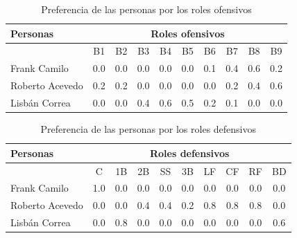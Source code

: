 \begin{table}[H]
		\centering
	\caption{Preferencia de las personas por los roles ofensivos}\label{pref-rol-of-pel}
	\begin{tabular}{l | c c c c c c c c c}
		\toprule[1.7pt]
		\multicolumn{1}{l}{Personas} &         \multicolumn{9}{c}{Roles ofensivos}         \\ \midrule
		                                                           & B1  & B2  & B3  & B4  & B5  & B6  & B7  & B8  & B9  \\ \cline{2-10}
		Frank Camilo                                               & 0.0 & 0.0 & 0.0 & 0.0 & 0.0 & 0.1 & 0.4 & 0.6 & 0.2 \\
		Roberto Acevedo                                            & 0.2 & 0.2 & 0.0 & 0.0 & 0.0 & 0.0 & 0.2 & 0.4 & 0.6 \\
		Lisbán Correa                                              & 0.0 & 0.0 & 0.4 & 0.6 & 0.5 & 0.2 & 0.1 & 0.0 & 0.0 \\
		\bottomrule[1.2pt]                          
	\end{tabular}
\end{table}

\begin{table}[H]
		\centering
	\caption{Preferencia de las personas por los roles defensivos}\label{pref-rol-def-pel}
		\begin{tabular}{l | c c c c c c c c c }
			\toprule[1.7pt]
			\multicolumn{1}{l}{Personas} &        \multicolumn{9}{c}{Roles defensivos}            \\ \midrule
			& C   & 1B  & 2B  & SS  & 3B  & LF  & CF  & RF  & BD    \\ \cline{2-10}
			Frank Camilo                                               & 1.0 & 0.0 & 0.0 & 0.0 & 0.0 & 0.0 & 0.0 & 0.0 & 0.0  \\
			Roberto Acevedo                                            & 0.0 & 0.0 & 0.4 & 0.4 & 0.2 & 0.8 & 0.8 & 0.8 & 0.0  \\
			Lisbán Correa                                              & 0.0 & 0.8 & 0.0 & 0.0 & 0.0 & 0.0 & 0.0 & 0.0 & 0.6  \\
			\bottomrule[1pt]                              
		\end{tabular}
	
\end{table}


